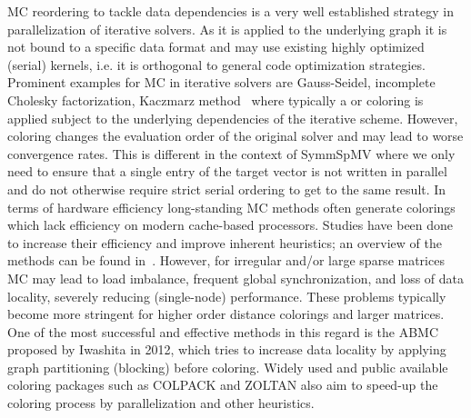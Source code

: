 \Acrfull{MC} reordering to tackle data dependencies is a very well established strategy in parallelization of iterative solvers. As it is applied to the underlying graph it is not bound to a specific data format and may use existing highly optimized (serial) kernels, i.e. it is orthogonal to general code optimization strategies.  
Prominent examples for  \acrshort{MC} in iterative solvers are Gauss-Seidel, incomplete 
Cholesky factorization, Kaczmarz method~\cite{RBGS,MC,feast_mc} where typically a \DONE or \DTWO coloring is applied subject to the underlying dependencies of the iterative scheme. However, coloring changes the evaluation order of the original solver and may lead to worse convergence rates. This is different in the context of \acrshort{SymmSpMV} where we only need to ensure that a single entry of the target vector is not written in parallel and do not otherwise require strict serial ordering to get to the same result. 
In terms of hardware efficiency long-standing \acrshort{MC} methods often generate colorings which lack efficiency on modern cache-based
processors. Studies have been done to increase their
efficiency and improve inherent heuristics; an overview of the methods can be found
in~\cite{dist_k_def,COLPACK,equitable_color}. However, 
for irregular and/or large sparse 
matrices \acrshort{MC} may lead to load imbalance, frequent global synchronization, 
and loss of data locality, severely reducing (single-node) performance. 
These problems typically become more stringent for higher order distance
colorings and larger matrices.
One of the most
successful and effective methods in this regard is
the \acrfull{ABMC}~\cite{ABMC} proposed by Iwashita \etal in 2012, which tries to increase data locality by applying graph partitioning (blocking) before coloring. 
Widely used and public available coloring packages such as COLPACK\cite{COLPACK} and ZOLTAN\cite{BOZDAG2008515,doi:10.1137/080732158} also aim to speed-up the coloring process by parallelization and other heuristics. 

